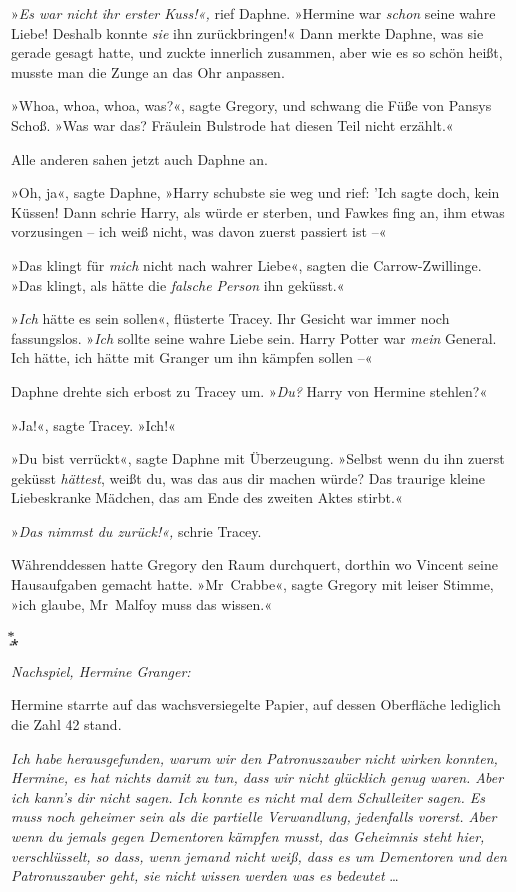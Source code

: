 {»\emph{Es war nicht ihr erster Kuss!«,} rief Daphne. »Hermine war \emph{schon} seine wahre Liebe! Deshalb konnte \emph{sie} ihn zurückbringen!« Dann merkte Daphne, was sie gerade gesagt hatte, und zuckte innerlich zusammen, aber wie es so schön heißt, musste man die Zunge an das Ohr anpassen.

»Whoa, whoa, whoa, was?«, sagte Gregory, und schwang die Füße von Pansys Schoß. »Was war das? Fräulein Bulstrode hat diesen Teil nicht erzählt.«

Alle anderen sahen jetzt auch Daphne an.

»Oh, ja«, sagte Daphne, »Harry schubste sie weg und rief: 'Ich sagte doch, kein Küssen! Dann schrie Harry, als würde er sterben, und Fawkes fing an, ihm etwas vorzusingen -- ich weiß nicht, was davon zuerst passiert ist --«

»Das klingt für \emph{mich} nicht nach wahrer Liebe«, sagten die Carrow-Zwillinge. »Das klingt, als hätte die \emph{falsche Person} ihn geküsst.«

»\emph{Ich} hätte es sein sollen«, flüsterte Tracey. Ihr Gesicht war immer noch fassungslos. »\emph{Ich} sollte seine wahre Liebe sein. Harry Potter war \emph{mein} General. Ich hätte, ich hätte mit Granger um ihn kämpfen sollen --«

Daphne drehte sich erbost zu Tracey um. »\emph{Du?} Harry von Hermine stehlen?«

»Ja!«, sagte Tracey. »Ich!«

»Du bist verrückt«, sagte Daphne mit Überzeugung. »Selbst wenn du ihn zuerst geküsst \emph{hättest}, weißt du, was das aus dir machen würde? Das traurige kleine Liebeskranke Mädchen, das am Ende des zweiten Aktes stirbt.«

»\emph{Das nimmst du zurück!«,} schrie Tracey.

Währenddessen hatte Gregory den Raum durchquert, dorthin wo Vincent seine Hausaufgaben gemacht hatte. »Mr~Crabbe«, sagte Gregory mit leiser Stimme, »ich glaube, Mr~Malfoy muss das wissen.«

͙⃰⁎

\emph{Nachspiel, Hermine Granger:}

Hermine starrte auf das wachsversiegelte Papier, auf dessen Oberfläche lediglich die Zahl 42 stand.

\emph{Ich habe herausgefunden, warum wir den Patronuszauber nicht wirken konnten, Hermine, es hat nichts damit zu tun, dass wir nicht glücklich genug waren. Aber ich kann's dir nicht sagen. Ich konnte es nicht mal dem Schulleiter sagen. Es muss noch geheimer sein als die partielle Verwandlung, jedenfalls vorerst. Aber wenn du jemals gegen Dementoren kämpfen musst, das Geheimnis steht hier, verschlüsselt, so dass, wenn jemand nicht weiß, dass es um Dementoren und den Patronuszauber geht, sie nicht wissen werden was es bedeutet} …

}
